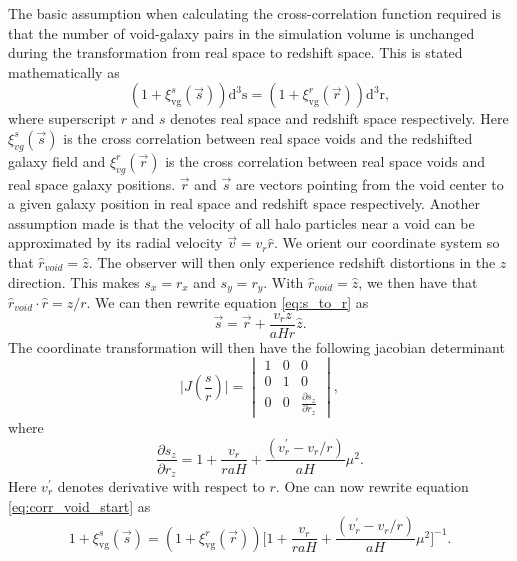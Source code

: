 The basic assumption when calculating the cross-correlation function
required is that the number of void-galaxy pairs in the simulation volume is
unchanged during the transformation from real space to redshift space. This is stated
mathematically as
\begin{equation}\label{eq:corr_void_start}
    (1 + \xi^s_{\mathrm{vg}}(\vec{s}))\mathrm{d}^3\mathrm{s}=(1 + \xi^r_{\mathrm{vg}}(\vec{r}))\mathrm{d}^3\mathrm{r},
\end{equation}
where superscript $r$ and $s$ denotes real space and redshift space respectively.
Here $\xi^s_{vg}(\vec{s})$ is the cross correlation between real space voids and
the redshifted galaxy field and $\xi^r_{vg}(\vec{r})$ is the cross correlation
between real space voids and real space galaxy positions. $\vec{r}$ and $\vec{s}$
are vectors pointing from the void center to a given galaxy position in
real space and redshift space respectively. Another assumption made
is that the velocity of all halo particles near a void can be approximated by
its radial velocity $\vec{v}=v_r \hat{r}$. We orient our coordinate system so that
$\hat{r}_{void}=\hat{z}$. The observer will then only experience redshift
distortions in the $z$ direction. This makes $s_x=r_x$ and $s_y=r_y$. With $\hat{r}_{void}=\hat{z}$, we then have that
$\hat{r}_{void}\cdot\hat{r}=z/r$. We can then rewrite equation \ref{eq:s_to_r}
as
\begin{equation}\label{eq:s_tp_r}
    \vec{s}=\vec{r}+\frac{v_rz}{aHr}\hat{z}.
\end{equation}
The coordinate transformation will then have the
following jacobian determinant
\begin{equation}
    \vert J(\frac{s}{r})\vert=
    \begin{vmatrix}
        1 & 0 & 0\\
        0 & 1 & 0\\
        0 & 0 & \frac{\partial s_z}{\partial r_z} 
    \end{vmatrix},
\end{equation}
where
\begin{equation}
    \frac{\partial s_z}{\partial r_z} = 1 + \frac{v_r}{raH}+\frac{(v_r^\prime-v_r/r)}{aH}\mu^2.
\end{equation}
Here $v_r^\prime$ denotes derivative with respect to $r$. One can now rewrite
equation \ref{eq:corr_void_start} as
\begin{equation}\label{eq:corr_temp}
    1 + \xi^s_{\mathrm{vg}}(\vec{s})=(1 + \xi^r_{\mathrm{vg}}(\vec{r})) \Big[1 + \frac{v_r}{raH}+\frac{(v_r^\prime-v_r/r)}{aH}\mu^2 \Big]^{-1}.
\end{equation}
